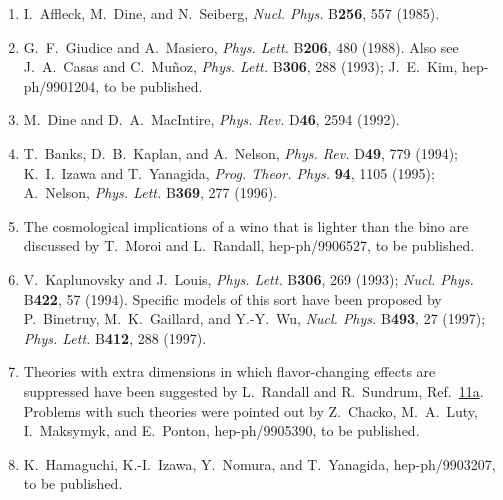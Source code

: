 \begin{enumerate}
  \item {}\label{ch31-ref-16}
  I.~Affleck, M.~Dine, and N.~Seiberg, \textit{Nucl. Phys.}
  B\textbf{256}, 557 (1985).

  \item {}\label{ch31-ref-17}
  G.~F.~Giudice and A.~Masiero, \textit{Phys. Lett.} B\textbf{206},
  480 (1988). Also see J.~A.~Casas and C.~Mu\~noz,
  \textit{Phys. Lett.} B\textbf{306}, 288 (1993); J.~E.~Kim,
  hep-ph/9901204, to be published.

  \item {}\label{ch31-ref-18}
  M.~Dine and D.~A.~MacIntire, \textit{Phys. Rev.} D\textbf{46}, 2594
  (1992).

  \item {}\label{ch31-ref-19}
  T.~Banks, D.~B.~Kaplan, and A.~Nelson, \textit{Phys. Rev.}
  D\textbf{49}, 779 (1994); K.~I.~Izawa and T.~Yanagida,
  \textit{Prog. Theor. Phys.} \textbf{94}, 1105 (1995); A.~Nelson,
  \textit{Phys. Lett.} B\textbf{369}, 277 (1996).

  \item[19a.] \label{ch31-ref-19a}
  The cosmological implications of a wino that is lighter than the bino
  are discussed by T.~Moroi and L.~Randall, hep-ph/9906527, to be
  published.

  \item {}\label{ch31-ref-20}
  V.~Kaplunovsky and J.~Louis, \textit{Phys. Lett.} B\textbf{306}, 269
  (1993); \textit{Nucl. Phys.} B\textbf{422}, 57 (1994). Specific
  models of this sort have been proposed by P.~Binetruy,
  M.~K.~Gaillard, and Y.-Y.~Wu, \textit{Nucl. Phys.} B\textbf{493}, 27
  (1997); \textit{Phys. Lett.} B\textbf{412}, 288 (1997).

  \item {}\label{ch31-ref-21}
  Theories with extra dimensions in which flavor-changing effects are
  suppressed have been suggested by L.~Randall and R.~Sundrum,
  Ref.~\hyperref[ch31-ref-11a]{11a}. Problems with such theories were
  pointed out by Z.~Chacko, M.~A.~Luty, I.~Maksymyk, and E.~Ponton,
  hep-ph/9905390, to be published.

  \item {}\label{ch31-ref-22}
  K.~Hamaguchi, K.-I.~Izawa, Y.~Nomura, and T.~Yanagida,
  hep-ph/9903207, to be published.
\end{enumerate}
